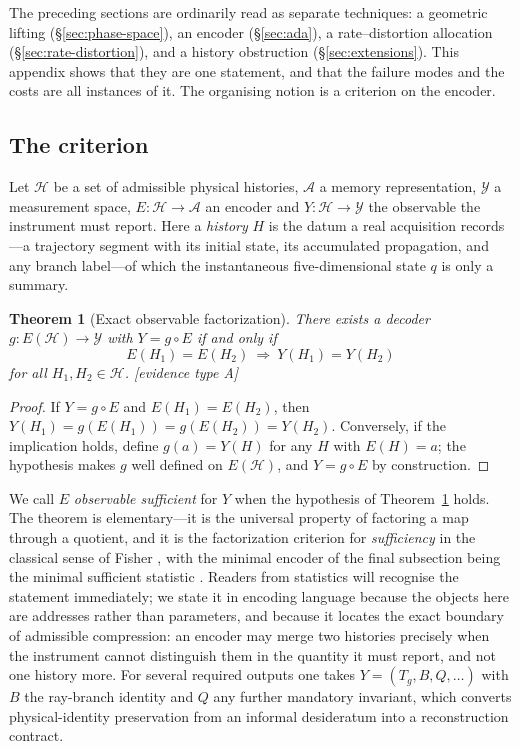 \documentclass[11pt]{article}
\newtheorem{theorem}{Theorem}
\begin{document}
The preceding sections are ordinarily read as separate techniques: a geometric lifting
(\S\ref{sec:phase-space}), an encoder (\S\ref{sec:ada}), a rate--distortion allocation
(\S\ref{sec:rate-distortion}), and a history obstruction (\S\ref{sec:extensions}). This
appendix shows that they are one statement, and that the failure modes and the costs are
all instances of it. The organising notion is a criterion on the encoder.

\subsection{The criterion}

Let $\mathcal{H}$ be a set of admissible physical histories, $\mathcal{A}$ a memory
representation, $\mathcal{Y}$ a measurement space, $E:\mathcal{H}\to\mathcal{A}$ an encoder
and $Y:\mathcal{H}\to\mathcal{Y}$ the observable the instrument must report. Here a
\emph{history} $H$ is the datum a real acquisition records---a trajectory segment with its
initial state, its accumulated propagation, and any branch label---of which the
instantaneous five-dimensional state $q$ is only a summary.

\begin{theorem}[Exact observable factorization]\label{thm:factorization}
There exists a decoder $g:E(\mathcal{H})\to\mathcal{Y}$ with $Y=g\circ E$ if and only if
\begin{equation}
\boxed{\;E(H_1)=E(H_2)\ \Longrightarrow\ Y(H_1)=Y(H_2)\;}
\end{equation}
for all $H_1,H_2\in\mathcal{H}$. [evidence type A]
\end{theorem}
\begin{proof}
If $Y=g\circ E$ and $E(H_1)=E(H_2)$, then
$Y(H_1)=g(E(H_1))=g(E(H_2))=Y(H_2)$. Conversely, if the implication holds, define
$g(a)=Y(H)$ for any $H$ with $E(H)=a$; the hypothesis makes $g$ well defined on
$E(\mathcal{H})$, and $Y=g\circ E$ by construction.
\end{proof}

We call $E$ \emph{observable sufficient} for $Y$ when the hypothesis of
Theorem~\ref{thm:factorization} holds. The theorem is elementary---it is the universal
property of factoring a map through a quotient, and it is the factorization criterion for
\emph{sufficiency} in the classical sense of Fisher \cite{fisher1922}, with the
minimal encoder of the final subsection being the minimal sufficient statistic
\cite{lehmannscheffe1950,bahadur1954}. Readers from statistics will recognise the
statement immediately; we state it in encoding language because the objects here are
addresses rather than parameters, and because it locates the exact boundary of
admissible compression: an encoder may merge two histories precisely when the instrument
cannot distinguish them in the quantity it must report, and not one history more. For
several required outputs one takes $Y=(T_g,B,Q,\dots)$ with $B$ the ray-branch identity and
$Q$ any further mandatory invariant, which converts physical-identity preservation from an
informal desideratum into a reconstruction contract.
\end{document}
